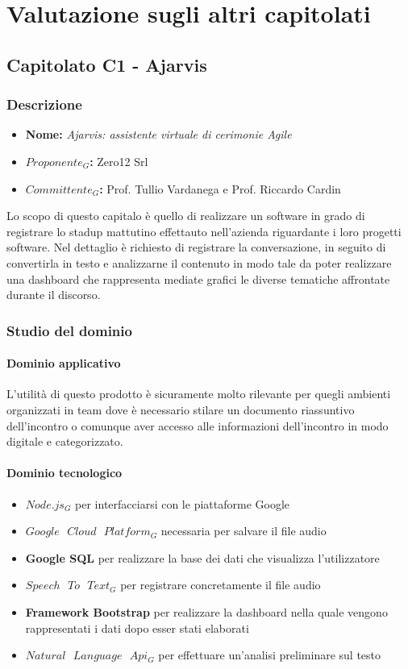 \section{Valutazione sugli altri capitolati}
	\subsection{Capitolato C1 - Ajarvis}
		\subsubsection{Descrizione}
		\begin{itemize}
			\item \textbf{Nome:} \emph{Ajarvis: assistente virtuale di cerimonie Agile}
			\item \textbf{$Proponente_G$:} Zero12 Srl
			\item \textbf{$Committente_G$:} Prof. Tullio Vardanega e Prof. Riccardo Cardin
		\end{itemize}
	    Lo scopo di questo capitalo è quello di realizzare un software in grado di registrare lo stadup mattutino effettauto nell'azienda riguardante i loro progetti software. Nel dettaglio è richiesto di registrare la conversazione, in seguito di convertirla in testo e analizzarne il contenuto in modo tale da poter realizzare una dashboard che rappresenta mediate grafici le diverse tematiche affrontate durante il discorso.  
		\subsubsection{Studio del dominio}
			\paragraph{Dominio applicativo} \Spazio
			 L'utilità di questo prodotto è sicuramente molto rilevante per quegli ambienti organizzati in team dove è necessario stilare un documento riassuntivo dell'incontro o comunque aver accesso alle informazioni dell'incontro in modo digitale e categorizzato.
			\paragraph{Dominio tecnologico}
			\begin{itemize}
				\item \textbf{$Node.js_G$} per interfacciarsi con le piattaforme Google
				\item  \textbf{$Google\text{ }Cloud\text{ } Platform_G$} necessaria per salvare il file audio 
				\item  \textbf{Google SQL} per realizzare la base dei dati che visualizza l'utilizzatore
				\item  \textbf{$Speech\text{ } To\text{ } Text_G$} per registrare concretamente il file audio
				\item  \textbf{Framework Bootstrap} per realizzare la dashboard nella quale vengono rappresentati i dati dopo esser stati elaborati
				\item  \textbf{$Natural\text{ }Language\text{ }Api_G$} per effettuare un'analisi preliminare sul testo	
			\end{itemize}
			

